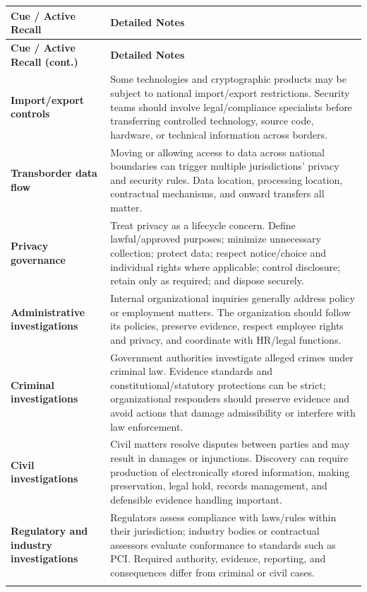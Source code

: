 \documentclass[10pt,letterpaper]{article}
\makeatletter
\newenvironment{cornell}
{\rowcolors{2}{white}{notebg}\begin{longtable}{@{}>{\raggedright\arraybackslash\columncolor{cuebg}\color{navy}\bfseries}p{0.285\textwidth}>{\raggedright\arraybackslash}p{0.65\textwidth}@{}}
\rowcolor{navy}\color{white}\textbf{Cue / Active Recall} & \color{white}\textbf{Detailed Notes}\\ \hline
\endfirsthead
\rowcolor{navy}\color{white}\textbf{Cue / Active Recall (cont.)} & \color{white}\textbf{Detailed Notes}\\ \hline
\endhead}
{\end{longtable}}
\newcommand{\noterow}[2]{#1 & #2\\\arrayrulecolor{line}\hline}
\makeatother
\begin{document}
\begin{cornell}
\noterow{Import/export controls}{Some technologies and cryptographic products may be subject to national import/export restrictions. Security teams should involve legal/compliance specialists before transferring controlled technology, source code, hardware, or technical information across borders.}
\noterow{Transborder data flow}{Moving or allowing access to data across national boundaries can trigger multiple jurisdictions' privacy and security rules. Data location, processing location, contractual mechanisms, and onward transfers all matter.}
\noterow{Privacy governance}{Treat privacy as a lifecycle concern. Define lawful/approved purposes; minimize unnecessary collection; protect data; respect notice/choice and individual rights where applicable; control disclosure; retain only as required; and dispose securely.}
\noterow{Administrative investigations}{Internal organizational inquiries generally address policy or employment matters. The organization should follow its policies, preserve evidence, respect employee rights and privacy, and coordinate with HR/legal functions.}
\noterow{Criminal investigations}{Government authorities investigate alleged crimes under criminal law. Evidence standards and constitutional/statutory protections can be strict; organizational responders should preserve evidence and avoid actions that damage admissibility or interfere with law enforcement.}
\noterow{Civil investigations}{Civil matters resolve disputes between parties and may result in damages or injunctions. Discovery can require production of electronically stored information, making preservation, legal hold, records management, and defensible evidence handling important.}
\noterow{Regulatory and industry investigations}{Regulators assess compliance with laws/rules within their jurisdiction; industry bodies or contractual assessors evaluate conformance to standards such as PCI. Required authority, evidence, reporting, and consequences differ from criminal or civil cases.}
\end{cornell}
\end{document}
